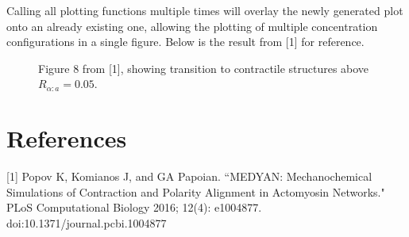 \documentclass[11pt, oneside]{article}   	%
\begin{document}
\noindent Calling all plotting functions multiple times will overlay the newly generated plot onto an already existing one, allowing the plotting of multiple concentration configurations in a single figure. Below is the result from [1] for reference.

\begin{figure}[h]
\caption{Figure 8 from [1], showing transition to contractile structures above $R_{\alpha:a}=0.05$.}
\centering
\end{figure}

\section{References}

[1] Popov K, Komianos J, and GA Papoian. ``MEDYAN: Mechanochemical Simulations 
\indent of Contraction and Polarity Alignment in Actomyosin Networks." PLoS Computational \indent Biology 2016; 12(4): e1004877. doi:10.1371/journal.pcbi.1004877
\end{document}
